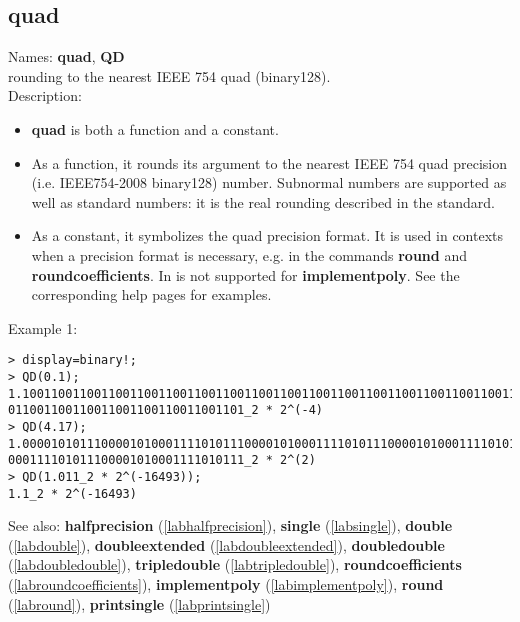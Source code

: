\subsection{quad}
\label{labquad}
\noindent Names: \textbf{quad}, \textbf{QD}\\
rounding to the nearest IEEE 754 quad (binary128).\\
\noindent Description: \begin{itemize}

\item \textbf{quad} is both a function and a constant.

\item As a function, it rounds its argument to the nearest IEEE 754 quad precision (i.e. IEEE754-2008 binary128) number.
   Subnormal numbers are supported as well as standard numbers: it is the real
   rounding described in the standard.

\item As a constant, it symbolizes the quad precision format. It is used in 
   contexts when a precision format is necessary, e.g. in the commands 
   \textbf{round} and \textbf{roundcoefficients}. In is not supported for \textbf{implementpoly}.
   See the corresponding help pages for examples.
\end{itemize}
\noindent Example 1: 
\begin{center}\begin{minipage}{15cm}\begin{Verbatim}[frame=single]
> display=binary!;
> QD(0.1);
1.100110011001100110011001100110011001100110011001100110011001100110011001100110
011001100110011001100110011001101_2 * 2^(-4)
> QD(4.17);
1.000010101110000101000111101011100001010001111010111000010100011110101110000101
000111101011100001010001111010111_2 * 2^(2)
> QD(1.011_2 * 2^(-16493));
1.1_2 * 2^(-16493)
\end{Verbatim}
\end{minipage}\end{center}
See also: \textbf{halfprecision} (\ref{labhalfprecision}), \textbf{single} (\ref{labsingle}), \textbf{double} (\ref{labdouble}), \textbf{doubleextended} (\ref{labdoubleextended}), \textbf{doubledouble} (\ref{labdoubledouble}), \textbf{tripledouble} (\ref{labtripledouble}), \textbf{roundcoefficients} (\ref{labroundcoefficients}), \textbf{implementpoly} (\ref{labimplementpoly}), \textbf{round} (\ref{labround}), \textbf{printsingle} (\ref{labprintsingle})
